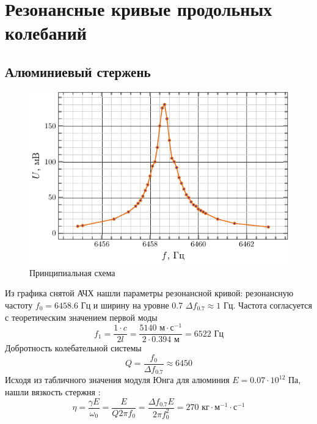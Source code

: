 \documentclass[a4paper,14pt]{extarticle}
\begin{document}
\newpage

\section{Резонансные кривые продольных колебаний}
\subsection{Алюминиевый стержень}
\begin{figure}[H]
	\centering
	\includegraphics[scale=1.5]{fig/al_afc}
	\caption{Принципиальная схема}
	\label{fig:chem1}
\end{figure}

Из графика снятой АЧХ нашли параметры резонансной кривой: резонансную частоту
$f_0=6458.6\text{ Гц}$ и ширину на уровне 0.7 $\Delta f_{0.7} \approx 1\text{ Гц}$. 
Частота согласуется с теоретическим значением первой моды
\begin{equation}
	f_1 = \frac{1\cdot c}{2l} = \frac{5140 \text{ м}\cdot\text{с}^{-1}}{2\cdot 0.394\text{ м}}=6522 \text{ Гц}
\end{equation}
Добротность колебательной системы
\begin{equation}
	Q = \frac{f_0}{\Delta f_{0.7}} \approx 6450
\end{equation}
Исходя из табличного значения модуля Юнга для алюминия $E=0.07\cdot10^{12}$ Па, нашли вязкость стержня  \cite[стр. 10]{met}:
\begin{equation}
	\eta = \frac{\gamma E}{\omega_0}= \frac{ E}{Q 2\pi f_0} = \frac{\Delta f_{0.7} E}{2\pi f_0^2}= 270 \text{ кг}\cdot\text{м}^{-1}\cdot\text{с}^{-1}
\end{equation}
\end{document}
